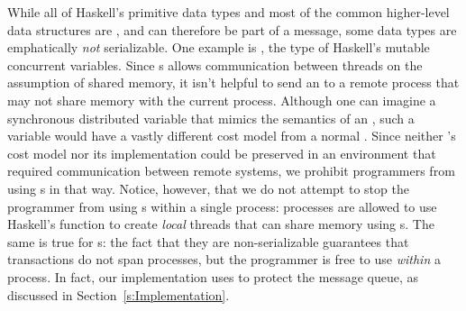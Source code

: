 \documentclass[preprint]{sigplanconf}
\begin{document}
While all of Haskell's primitive data types and most of the common higher-level data structures are , and can therefore be part of a message, some data types are emphatically \emph{not} serializable. 
One example is , the type of Haskell's mutable concurrent variables. Since s allows communication between threads on the assumption of shared memory, it isn't helpful to send an  to a remote process that may not share memory with the current process. 
Although one can imagine a synchronous distributed variable that mimics the semantics of an , such a variable would have a vastly different cost model from a normal . 
Since neither 's cost model nor its implementation could be preserved in an environment that required communication between remote systems, we  prohibit programmers from using s in that way.  
Notice, however, that we do not attempt to stop the programmer from using s within a single process: processes are allowed to use Haskell's  function to create \emph{local} threads that can share memory using s.
The same is true for s: the fact that they are non-serializable guarantees that  transactions 
do not span processes, but the programmer is free to use  \emph{within} a process.  
In fact, our implementation uses  to protect the message queue, as discussed in Section~\ref{s:Implementation}.



\end{document}
